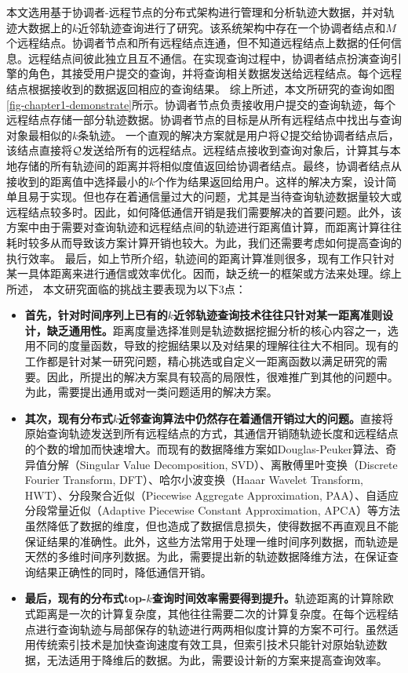 本文选用基于协调者-远程节点的分布式架构进行管理和分析轨迹大数据，并对轨迹大数据上的$k$近邻轨迹查询进行了研究。该系统架构中存在一个协调者结点和$M$个远程结点。协调者节点和所有远程结点连通，但不知道远程结点上数据的任何信息。远程结点间彼此独立且互不通信。在实现查询过程中，协调者结点扮演查询引擎的角色，其接受用户提交的查询，并将查询相关数据发送给远程结点。每个远程结点根据接收到的数据返回相应的查询结果。
综上所述，本文所研究的查询如图\ref{fig-chapter1-demonstrate}所示。协调者节点负责接收用户提交的查询轨迹，每个远程结点存储一部分轨迹数据。协调者节点的目标是从所有远程结点中找出与查询对象最相似的$k$条轨迹。
一个直观的解决方案就是用户将$\cal Q$提交给协调者结点后，该结点直接将$\cal Q$发送给所有的远程结点。远程结点接收到查询对象后，计算其与本地存储的所有轨迹间的距离并将相似度值返回给协调者结点。最终，协调者结点从接收到的距离值中选择最小的$k$个作为结果返回给用户。这样的解决方案，设计简单且易于实现。但也存在着通信量过大的问题，尤其是当待查询轨迹数据量较大或远程结点较多时。因此，如何降低通信开销是我们需要解决的首要问题。此外，该方案中由于需要对查询轨迹和远程结点间的轨迹进行距离值计算，而距离计算往往耗时较多从而导致该方案计算开销也较大。为此，我们还需要考虑如何提高查询的执行效率。
最后，如上节所介绍，轨迹间的距离计算准则很多，现有工作只针对某一具体距离来进行通信或效率优化。因而，缺乏统一的框架或方法来处理。综上所述，
本文研究面临的挑战主要表现为以下3点：
\begin{itemize}
	\item  \textbf{首先，针对时间序列上已有的$k$近邻轨迹查询技术往往只针对某一距离准则设计，缺乏通用性。}距离度量选择准则是轨迹数据挖掘分析的核心内容之一，选用不同的度量函数，导致的挖掘结果以及对结果的理解往往大不相同。现有的工作都是针对某一研究问题，精心挑选或自定义一距离函数以满足研究的需要。因此，所提出的解决方案具有较高的局限性，很难推广到其他的问题中。为此，需要提出通用或对一类问题适用的解决方案。
	
	\item \textbf{其次，现有分布式$k$近邻查询算法中仍然存在着通信开销过大的问题。}直接将原始查询轨迹发送到所有远程结点的方式，其通信开销随轨迹长度和远程结点的个数的增加而快速增大。而现有的数据降维方案如Douglas-Peuker算法、奇异值分解（Singular Value Decomposition, SVD）、离散傅里叶变换（Discrete Fourier Transform, DFT）、哈尔小波变换（Haaar Wavelet Transform, HWT）、分段聚合近似（Piecewise Aggregate Approximation, PAA）、自适应分段常量近似（Adaptive Piecewise Constant Approximation, APCA）等方法虽然降低了数据的维度，但也造成了数据信息损失，使得数据不再直观且不能保证结果的准确性。此外，这些方法常用于处理一维时间序列数据，而轨迹是天然的多维时间序列数据。为此，需要提出新的轨迹数据降维方法，在保证查询结果正确性的同时，降低通信开销。

	\item \textbf{最后，现有的分布式top-$k$查询时间效率需要得到提升。}轨迹距离的计算除欧式距离是一次的计算复杂度，其他往往需要二次的计算复杂度。在每个远程结点进行查询轨迹与局部保存的轨迹进行两两相似度计算的方案不可行。虽然适用传统索引技术是加快查询速度有效工具，但索引技术只能针对原始轨迹数据，无法适用于降维后的数据。为此，需要设计新的方案来提高查询效率。
	
\end{itemize}

